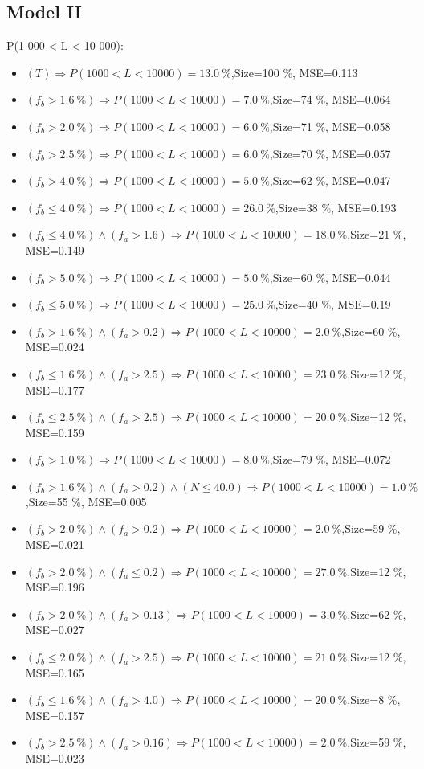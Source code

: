 \documentclass[numbered]{CSL}
\begin{document}
\subsection{Model II}
P(1 000 < L < 10 000):
\begin{itemize}
\item $(T) \Rightarrow P(1 000 < L < 10 000) = 13.0~\%$,\hfill Size=100 \%, MSE=0.113
\item $(f_b > 1.6~\%) \Rightarrow P(1 000 < L < 10 000) = 7.0~\%$,\hfill Size=74 \%, MSE=0.064
\item $(f_b > 2.0~\%) \Rightarrow P(1 000 < L < 10 000) = 6.0~\%$,\hfill Size=71 \%, MSE=0.058
\item $(f_b > 2.5~\%) \Rightarrow P(1 000 < L < 10 000) = 6.0~\%$,\hfill Size=70 \%, MSE=0.057
\item $(f_b > 4.0~\%) \Rightarrow P(1 000 < L < 10 000) = 5.0~\%$,\hfill Size=62 \%, MSE=0.047
\item $(f_b \leq 4.0~\%) \Rightarrow P(1 000 < L < 10 000) = 26.0~\%$,\hfill Size=38 \%, MSE=0.193
\item $(f_b \leq 4.0~\%) \land (f_a > 1.6) \Rightarrow P(1 000 < L < 10 000) = 18.0~\%$,\hfill Size=21 \%, MSE=0.149
\item $(f_b > 5.0~\%) \Rightarrow P(1 000 < L < 10 000) = 5.0~\%$,\hfill Size=60 \%, MSE=0.044
\item $(f_b \leq 5.0~\%) \Rightarrow P(1 000 < L < 10 000) = 25.0~\%$,\hfill Size=40 \%, MSE=0.19
\item $(f_b > 1.6~\%) \land (f_a > 0.2) \Rightarrow P(1 000 < L < 10 000) = 2.0~\%$,\hfill Size=60 \%, MSE=0.024
\item $(f_b \leq 1.6~\%) \land (f_a > 2.5) \Rightarrow P(1 000 < L < 10 000) = 23.0~\%$,\hfill Size=12 \%, MSE=0.177
\item $(f_b \leq 2.5~\%) \land (f_a > 2.5) \Rightarrow P(1 000 < L < 10 000) = 20.0~\%$,\hfill Size=12 \%, MSE=0.159
\item $(f_b > 1.0~\%) \Rightarrow P(1 000 < L < 10 000) = 8.0~\%$,\hfill Size=79 \%, MSE=0.072
\item $(f_b > 1.6~\%) \land (f_a > 0.2) \land (N \leq 40.0) \Rightarrow P(1 000 < L < 10 000) = 1.0~\%$,\hfill Size=55 \%, MSE=0.005
\item $(f_b > 2.0~\%) \land (f_a > 0.2) \Rightarrow P(1 000 < L < 10 000) = 2.0~\%$,\hfill Size=59 \%, MSE=0.021
\item $(f_b > 2.0~\%) \land (f_a \leq 0.2) \Rightarrow P(1 000 < L < 10 000) = 27.0~\%$,\hfill Size=12 \%, MSE=0.196
\item $(f_b > 2.0~\%) \land (f_a > 0.13) \Rightarrow P(1 000 < L < 10 000) = 3.0~\%$,\hfill Size=62 \%, MSE=0.027
\item $(f_b \leq 2.0~\%) \land (f_a > 2.5) \Rightarrow P(1 000 < L < 10 000) = 21.0~\%$,\hfill Size=12 \%, MSE=0.165
\item $(f_b \leq 1.6~\%) \land (f_a > 4.0) \Rightarrow P(1 000 < L < 10 000) = 20.0~\%$,\hfill Size=8 \%, MSE=0.157
\item $(f_b > 2.5~\%) \land (f_a > 0.16) \Rightarrow P(1 000 < L < 10 000) = 2.0~\%$,\hfill Size=59 \%, MSE=0.023
\end{itemize}
\end{document}
